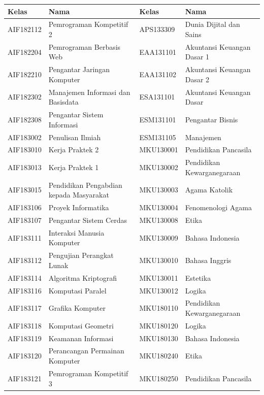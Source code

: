 \begin{enumerate}
\begin{table}[H]
\centering
\label{tab:kelasmatakuliah2018_4}
\begin{tabular}{|p{3.25cm}|p{4.25cm}|p{3.25cm}|p{4.25cm}|}
\hline
\textbf{Kelas} & \textbf{Nama} & \textbf{Kelas} & \textbf{Nama} \\ \hline
AIF182112 & Pemrograman Kompetitif 2 & APS133309 & Dunia Dijital dan Sains \\ \hline
AIF182204 & Pemrograman Berbasis Web & EAA131101 & Akuntansi Keuangan Dasar 1 \\ \hline
AIF182210 & Pengantar Jaringan Komputer & EAA131102 & Akuntansi Keuangan Dasar 2 \\ \hline
AIF182302 & Manajemen Informasi dan Basisdata & ESA131101 & Akuntansi Keuangan Dasar \\ \hline
AIF182308 & Pengantar Sistem Informasi & ESM131101 & Pengantar Bisnis \\ \hline
AIF183002 & Penulisan Ilmiah & ESM131105 & Manajemen \\ \hline
AIF183010 & Kerja Praktek 2 & MKU130001 & Pendidikan Pancasila \\ \hline
AIF183013 & Kerja Praktek 1 & MKU130002 & Pendidikan Kewarganegaraan \\ \hline
AIF183015 & Pendidikan Pengabdian kepada Masyarakat & MKU130003 & Agama Katolik \\ \hline
AIF183106 & Proyek Informatika & MKU130004 & Fenomenologi Agama \\ \hline
AIF183107 & Pengantar Sistem Cerdas & MKU130008 & Etika \\ \hline
AIF183111 & Interaksi Manusia Komputer & MKU130009 & Bahasa Indonesia \\ \hline
AIF183112 & Pengujian Perangkat Lunak & MKU130010 & Bahasa Inggris \\ \hline
AIF183114 & Algoritma Kriptografi & MKU130011 & Estetika \\ \hline
AIF183116 & Komputasi Paralel & MKU130012 & Logika \\ \hline
AIF183117 & Grafika Komputer & MKU180110 & Pendidikan Kewarganegaraan \\ \hline
AIF183118 & Komputasi Geometri & MKU180120 & Logika \\ \hline
AIF183119 & Keamanan Informasi & MKU180130 & Bahasa Indonesia \\ \hline
AIF183120 & Perancangan Permainan Komputer & MKU180240 & Etika \\ \hline
AIF183121 & Pemrograman Kompetitif 3 & MKU180250 & Pendidikan Pancasila \\ \hline

\end{tabular}
\end{table}
\end{enumerate}
